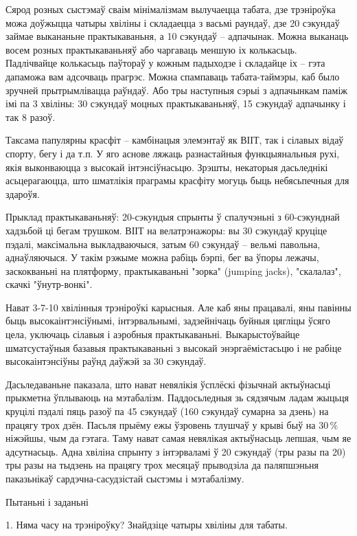 Сярод розных сыстэмаў сваім мінімалізмам вылучаецца табата, дзе трэніроўка можа доўжыцца чатыры хвіліны і складаецца з васьмі раундаў, дзе 20 сэкундаў займае выкананьне практыкаваньня, а 10 сэкундаў – адпачынак. Можна выканаць восем розных практыкаваньняў або чаргаваць меншую іх колькасьць. Падлічвайце колькасьць паўтораў у кожным падыходзе і складайце іх – гэта дапаможа вам адсочваць прагрэс. Можна спампаваць табата-таймэры, каб было зручней прытрымлівацца раўндаў. Або тры наступныя сэрыі з адпачынкам паміж імі па 3 хвіліны: 30 сэкундаў моцных практыкаваньняў, 15 сэкундаў адпачынку і так 8 разоў.

Таксама папулярны красфіт – камбінацыя элемэнтаў як ВІІТ, так і сілавых відаў спорту, бегу і да т.п. У яго аснове ляжаць разнастайныя функцыянальныя рухі, якія выконваюцца з высокай інтэнсіўнасьцю. Зрэшты, некаторыя дасьледнікі асьцерагаюцца, што шматлікія праграмы красфіту могуць быць небясьпечныя для здароўя.

Прыклад практыкаваньняў: 20-сэкундыя спрынты ў спалучэньні з 60-сэкунднай хадзьбой ці бегам трушком. ВІІТ на велатрэнажоры: вы 30 сэкундаў круціце пэдалі, максімальна выкладваючыся, затым 60 сэкундаў – вельмі павольна, аднаўляючыся. У такім рэжыме можна рабіць бэрпі, бег ва ўпоры лежачы, заскокваньні на плятформу, практыкаваньні "зорка" (jumping jacks), "скалалаз", скачкі "ўнутр-вонкі".

Нават 3-7-10 хвілінныя трэніроўкі карысныя. Але каб яны працавалі, яны павінны быць высокаінтэнсіўнымі, інтэрвальнымі, задзейнічаць буйныя цягліцы ўсяго цела, уключаць сілавыя і аэробныя практыкаваньні. Выкарыстоўвайце шматсустаўныя базавыя практыкаваньні з высокай энэргаёмістасьцю і не рабіце высокаінтэнсіўны раўнд даўжэй за 30 сэкундаў. 

Дасьледаваньне паказала, што нават невялікія ўсплёскі фізычнай актыўнасьці прыкметна ўплываюць на мэтабалізм. Паддосьледныя зь сядзячым ладам жыцьця круцілі пэдалі пяць разоў па 45 сэкундаў (160 сэкундаў сумарна за дзень) на працягу трох дзён. Пасьля прыёму ежы ўзровень тлушчаў у крыві быў на 30\,\% ніжэйшы, чым да гэтага. Таму нават самая невялікая актыўнасьць лепшая, чым яе адсутнасьць. Адна хвіліна спрынту з інтэрваламі ў 20 сэкундаў (тры разы па 20) тры разы на тыдзень на працягу трох месяцаў прыводзіла да паляпшэньня паказьнікаў сардэчна-сасудзістай сыстэмы і мэтабалізму.

Пытаньні і заданьні

1. Няма часу на трэніроўку? Знайдзіце чатыры хвіліны для табаты.

